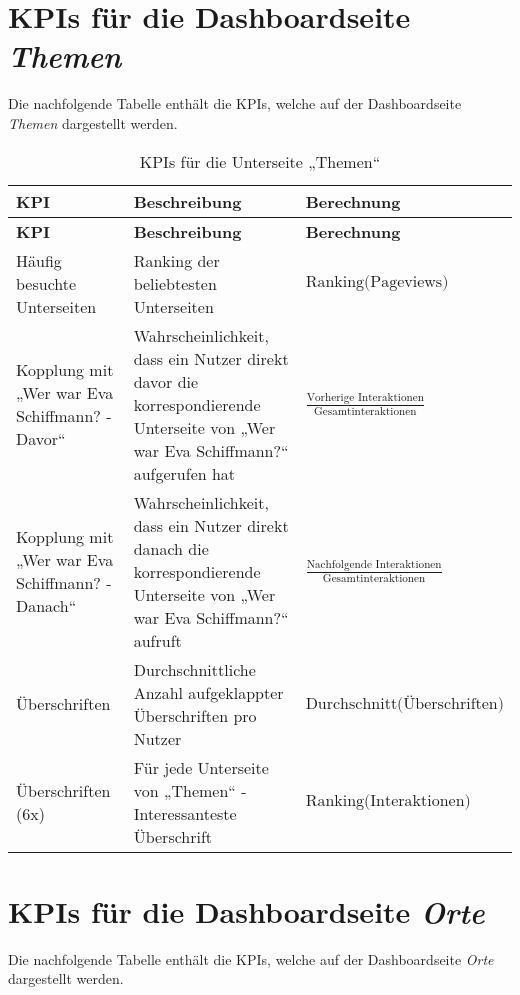 \section{KPIs für die Dashboardseite \textit{Themen}}
Die nachfolgende Tabelle enthält die KPIs, welche auf der Dashboardseite \textit{Themen} dargestellt werden.

\renewcommand{\arraystretch}{1.5} %
\begin{xltabular}{\textwidth}{|X|X|X|}
    \caption{KPIs für die Unterseite „Themen“} \label{tab:kpi_themen} \\
    \hline
    \textbf{KPI} & \textbf{Beschreibung} & \textbf{Berechnung} \\ \hline
    \endfirsthead

    \hline
    \textbf{KPI} & \textbf{Beschreibung} & \textbf{Berechnung} \\ \hline
    \endhead

    \hline
    \endfoot

    \hline
    \endlastfoot

    Häufig besuchte Unterseiten & Ranking der beliebtesten Unterseiten & {\footnotesize \(\text{Ranking(Pageviews)}\)} \\ \hline
    Kopplung mit „Wer war Eva Schiffmann? - Davor“ & Wahrscheinlichkeit, dass ein Nutzer direkt davor die korrespondierende Unterseite von „Wer war Eva Schiffmann?“ aufgerufen hat & {\footnotesize \(\frac{\text{Vorherige Interaktionen}}{\text{Gesamtinteraktionen}}\)} \\ \hline
    Kopplung mit „Wer war Eva Schiffmann? - Danach“ & Wahrscheinlichkeit, dass ein Nutzer direkt danach die korrespondierende Unterseite von „Wer war Eva Schiffmann?“ aufruft & {\footnotesize \(\frac{\text{Nachfolgende Interaktionen}}{\text{Gesamtinteraktionen}}\)} \\ \hline
    Überschriften & Durchschnittliche Anzahl aufgeklappter Überschriften pro Nutzer & {\footnotesize \(\text{Durchschnitt(Überschriften)}\)} \\ \hline
    Überschriften (6x) & Für jede Unterseite von „Themen“ - Interessanteste Überschrift & {\footnotesize \(\text{Ranking(Interaktionen)}\)} \\ \hline
\end{xltabular}

\section{KPIs für die Dashboardseite \textit{Orte}}
Die nachfolgende Tabelle enthält die KPIs, welche auf der Dashboardseite \textit{Orte} dargestellt werden.

